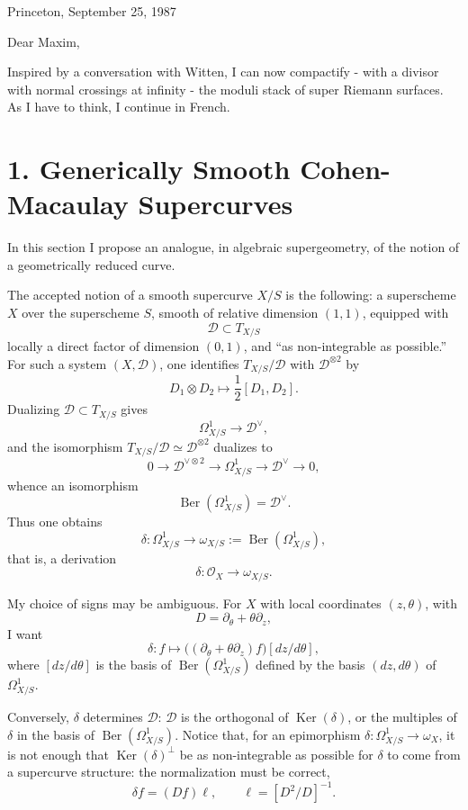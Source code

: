 \documentclass[11pt]{article}
\newcommand{\cO}{\mathcal O}
\newcommand{\cD}{\mathcal D}
\newcommand{\Ber}{\operatorname{Ber}}
\newcommand{\Ker}{\operatorname{Ker}}
\begin{document}
\begin{flushright}
Princeton, September 25, 1987
\end{flushright}

Dear Maxim,

Inspired by a conversation with Witten, I can now compactify - with a divisor with normal crossings at infinity - the moduli stack of super Riemann surfaces. As I have to think, I continue in French.

\section*{1. Generically Smooth Cohen-Macaulay Supercurves}

In this section I propose an analogue, in algebraic supergeometry, of the notion of a geometrically reduced curve.

The accepted notion of a smooth supercurve $X/S$ is the following: a superscheme $X$ over the superscheme $S$, smooth of relative dimension $(1,1)$, equipped with
\[
  \cD\subset T_{X/S}
\]
locally a direct factor of dimension $(0,1)$, and ``as non-integrable as possible.'' For such a system $(X,\cD)$, one identifies $T_{X/S}/\cD$ with $\cD^{\otimes 2}$ by
\[
  D_1\otimes D_2\longmapsto \frac12[D_1,D_2].
\]
Dualizing $\cD\subset T_{X/S}$ gives
\begin{equation}\tag{1.1}
  \Omega^1_{X/S}\longrightarrow \cD^\vee,
\end{equation}
and the isomorphism $T_{X/S}/\cD\simeq \cD^{\otimes 2}$ dualizes to
\[
  0\longrightarrow \cD^{\vee\otimes 2}
    \longrightarrow \Omega^1_{X/S}
    \longrightarrow \cD^\vee\longrightarrow 0,
\]
whence an isomorphism
\[
  \Ber(\Omega^1_{X/S})=\cD^\vee.
\]
Thus one obtains
\begin{equation}\tag{1.2}
  \delta:\Omega^1_{X/S}\longrightarrow \omega_{X/S}:=\Ber(\Omega^1_{X/S}),
\end{equation}
that is, a derivation
\[
  \delta:\cO_X\longrightarrow\omega_{X/S}.
\]

My choice of signs may be ambiguous. For $X$ with local coordinates $(z,\theta)$, with
\[
  D=\partial_\theta+\theta\partial_z,
\]
I want
\[
  \delta:f\longmapsto \bigl((\partial_\theta+\theta\partial_z)f\bigr)[dz/d\theta],
\]
where $[dz/d\theta]$ is the basis of $\Ber(\Omega^1_{X/S})$ defined by the basis $(dz,d\theta)$ of $\Omega^1_{X/S}$.

Conversely, $\delta$ determines $\cD$: $\cD$ is the orthogonal of $\Ker(\delta)$, or the multiples of $\delta$ in the basis of $\Ber(\Omega^1_{X/S})$. Notice that, for an epimorphism $\delta:\Omega^1_{X/S}\to\omega_X$, it is not enough that $\Ker(\delta)^{\perp}$ be as non-integrable as possible for $\delta$ to come from a supercurve structure: the normalization must be correct,
\[
  \delta f=(Df)\ell,
  \qquad \ell=[D^2/D]^{-1}.
\]
\end{document}

